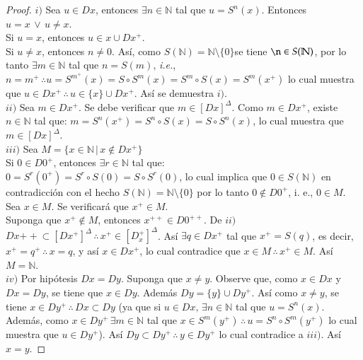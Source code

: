 \begin{proof}$i)$ Sea $u \in Dx$, entonces $\exists n \in \mathbb{N}$ tal que $u =
    S^n(x)$. Entonces $u=x \, \lor \, u \neq x$. \\
    Si $u = x$, entonces $u \in {x} \cup Dx^+$. \\
    Si $u \neq x$, entonces $n \neq 0$. Así, como $S(\mathbb{N}) = \mathbb{N}
    \setminus \{0\} $se tiene $\n \in S(\mathbb{N})$, por lo tanto $\exists m \in
    \mathbb{N}$ tal que $n= S(m)$, \textit{i.e.}, $n=m^+ \, \therefore u = S^{m^+}(x) = 
    S\circ S^{m}(x) = S^m \circ S(x) = S^m(x^+)$ lo cual muestra que $u\in
    Dx^+\, \therefore \, u \in \{x\} \cup Dx^+$. Así se demuestra $i)$. \\

    $ii)$ Sea $m \in Dx^+$. Se debe verificar que $m \in [Dx]^{\Delta}$. Como $m
    \in Dx^+$, existe $n\in \mathbb{N}$ tal que: $m = S^n(x^+) =S^n \circ S(x) =
    S \circ S^n (x)$, lo cual muestra que $m \in [Dx]^{\Delta}$. \\

    $iii)$ Sea $M= \{x \in \mathbb{N} \, | \, x \notin Dx^+ \}$ \\
    Si $0 \in D0^+$, entonces $\exists r \in \mathbb{N}$ tal que: \\
    $0 = S^r(0^+) = S^r \circ S(0) = S \circ S^r (0)$, lo cual implica que $0
    \in S(\mathbb{N})$ en contradicción con el hecho $S(\mathbb{N}) =
    \mathbb{N}\setminus \{0\}$ por lo tanto $0 \notin D0^+$, i. e., $0 \in M$.
    \\
    Sea $x \in M$. Se verificará que $x^+ \in M$. \\
    Suponga que $x^+ \notin M$, entonces $x^{++}\in D0^{++}$. De $ii)$ $Dx{++}
    \subset [Dx^+]^{\Delta}\, \therefore \, x^+ \in [D_x^+]^{\Delta}$. Así
    $\exists q \in Dx^{+}$ tal que $x^+ = S(q)$, es decir, $x^+ = q^+ \,
    \therefore \, x=q$, y así $x \in Dx^+$, lo cual contradice que $x \in M\,
    \therefore \, x^+ \in M$. Así $M = \mathbb{N}$. \\

    $iv)$ Por hipótesis $Dx=Dy$. Suponga que $x \neq y$. Observe que, como $x
    \in Dx$ y $Dx = Dy$, se tiene que $x \in Dy$. Además $Dy = \{y\} \cup Dy^+$.
    Así como $x \neq y$, se tiene $x \in Dy^+\, \therefore \, Dx \subset Dy$ (ya
    que si $u \in Dx, \, \exists n \in \mathbb{N}$ tal que $u = S^n(x)$. Además,
    como $x \in Dy^+ \, \exists m \in \mathbb{N}$ tal que $x \in S^m(y^+)\,
    \therefore \, u=S^n \circ S^m(y^+)$ lo cual muestra que $u \in Dy^+$). Así
    $Dy \subset Dy^+ \, \therefore \, y \in Dy^+$ lo cual contradice a $iii)$.
    Así $x=y$.
\end{proof}
